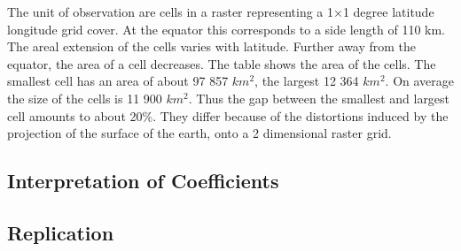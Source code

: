 \documentclass[
  a4paper,
]{article}
\begin{document}
The unit of observation are cells in a raster representing a 1×1 degree
latitude longitude grid cover. At the equator this corresponds to a side
length of 110 km. The areal extension of the cells varies with latitude.
Further away from the equator, the area of a cell decreases. The table
shows the area of the cells. The smallest cell has an area of about 97
857 \(km^{2}\), the largest 12 364 \(km^{2}\). On average the size of
the cells is 11 900 \(km^{2}\). Thus the gap between the smallest and
largest cell amounts to about 20\%. They differ because of the
distortions induced by the projection of the surface of the earth, onto
a 2 dimensional raster grid.

\hypertarget{interpretation-of-coefficients}{%
\subsection{Interpretation of
Coefficients}\label{interpretation-of-coefficients}}

\hypertarget{replication}{%
\subsection{Replication}\label{replication}}
\end{document}
